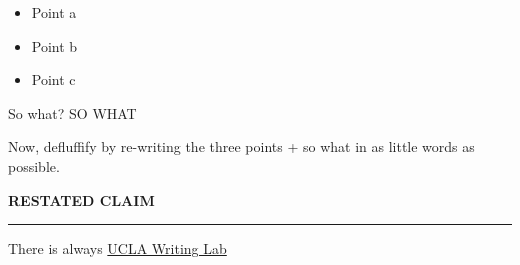 \documentclass[letterpaper]{article}
\begin{document}
\begin{itemize}
\item Point a
\item Point b
\item Point c
\end{itemize}

So what? SO WHAT

Now, defluffify by re-writing the three points + so what in as little
words as possible.

\textbf{RESTATED CLAIM}

\noindent\rule{\textwidth}{0.5pt}

There is always
\href{https://wp.ucla.edu/wp-content/uploads/2016/01/UWC\_handouts\_What-How-So-What-Thesis-revised-5-4-15-RZ.pdf}{UCLA
Writing Lab}
\end{document}
